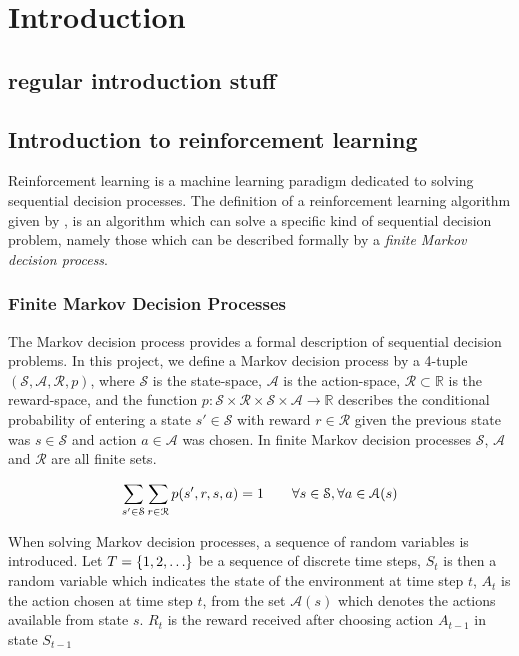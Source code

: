 \section{Introduction}

\subsection{regular introduction stuff}

\subsection{Introduction to reinforcement learning}
Reinforcement learning is a machine learning paradigm dedicated to solving sequential decision processes. The definition of a reinforcement learning algorithm given by \citet{RLBook2018}, is an algorithm which can solve a specific kind of sequential decision problem, namely those which can be described formally by a \textit{finite Markov decision process}.


\subsubsection{Finite Markov Decision Processes}

The Markov decision process provides a formal description of sequential decision problems. 
In this project, we define a Markov decision process by a 4-tuple $(\mathcal{S},\mathcal{A},\mathcal{R}, p)$, where $\mathcal{S}$ is the state-space, $\mathcal{A}$ is the action-space, $\mathcal{R} \subset \mathbb{R}$ is the reward-space, and the function $p : \mathcal{S} \times \mathcal{R} \times \mathcal{S} \times \mathcal{A} \rightarrow \mathbb{R}$ describes the conditional probability of entering a state $s' \in \mathcal{S}$ with reward $r \in \mathcal{R}$ given the previous state was $s \in \mathcal{S}$ and action $a \in \mathcal{A}$ was chosen.
In finite Markov decision processes $\mathcal{S}$, $\mathcal{A}$ and $\mathcal{R}$ are all finite sets. 

\begin{align}
    \sum_{s' \in \mathcal{S}}\sum_{r \in \mathcal{R}} p(s', r, s, a) = 1 \qquad \forall s \in \mathcal{S}, \forall a \in \mathcal{A}(s)
\end{align}

\vspace*{0.5cm}

When solving Markov decision processes, a sequence of random variables is introduced. Let $T = \left\{1, 2, \ldots\right\}$ be a sequence of discrete time steps, $S_t$ is then a random variable which indicates the state of the environment at time step $t$, $A_t$ is the action chosen at time step $t$, from the set $\mathcal{A}(s)$ which denotes the actions available from state $s$. 
$R_t$ is the reward received after choosing action $A_{t-1}$ in state $S_{t-1}$

